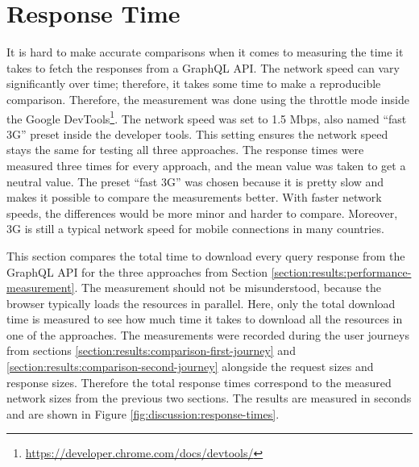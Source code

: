 \section{Response Time}\label{section:discussion:response-times}

It is hard to make accurate comparisons when it comes to measuring the time it takes to fetch the responses from a GraphQL \ac{API}. The network speed can vary significantly over time; therefore, it takes some time to make a reproducible comparison. Therefore, the measurement was done using the throttle mode inside the Google DevTools\footnote{\url{https://developer.chrome.com/docs/devtools/}}. The network speed was set to 1.5 Mbps, also named \enquote{fast 3G} preset inside the developer tools. This setting ensures the network speed stays the same for testing all three approaches. The response times were measured three times for every approach, and the mean value was taken to get a neutral value. The preset \enquote{fast 3G} was chosen because it is pretty slow and makes it possible to compare the measurements better. With faster network speeds, the differences would be more minor and harder to compare. Moreover, 3G is still a typical network speed for mobile connections in many countries.

\bigskip

\noindent This section compares the total time to download every query response from the GraphQL \ac{API} for the three approaches from Section \ref{section:results:performance-measurement}. The measurement should not be misunderstood, because the browser typically loads the resources in parallel. Here, only the total download time is measured to see how much time it takes to download all the resources in one of the approaches. The measurements were recorded during the user journeys from sections \ref{section:results:comparison-first-journey} and \ref{section:results:comparison-second-journey} alongside the request sizes and response sizes. Therefore the total response times correspond to the measured network sizes from the previous two sections. The results are measured in seconds and are shown in Figure \ref{fig:discussion:response-times}. 

